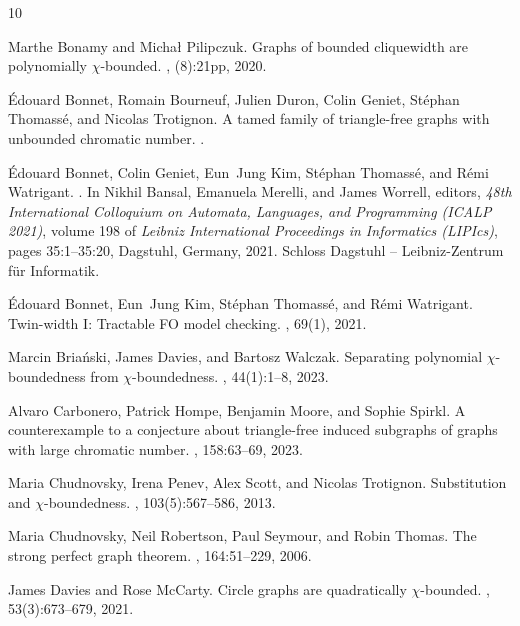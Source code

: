 \begin{thebibliography}{10}

Marthe Bonamy and Micha\l{} Pilipczuk.
\newblock Graphs of bounded cliquewidth are polynomially $\chi$-bounded.
, (8):21pp, 2020.

\'Edouard Bonnet, Romain Bourneuf, Julien Duron, Colin Geniet, Stéphan
  Thomassé, and Nicolas Trotignon.
\newblock A tamed family of triangle-free graphs with unbounded chromatic
  number.
.

\'{E}douard Bonnet, Colin Geniet, Eun~Jung Kim, St\'{e}phan Thomass\'{e}, and
  R\'{e}mi Watrigant.
.
\newblock In Nikhil Bansal, Emanuela Merelli, and James Worrell, editors, {\em
  48th International Colloquium on Automata, Languages, and Programming (ICALP
  2021)}, volume 198 of {\em Leibniz International Proceedings in Informatics
  (LIPIcs)}, pages 35:1--35:20, Dagstuhl, Germany, 2021. Schloss Dagstuhl --
  Leibniz-Zentrum f{\"u}r Informatik.

\'{E}douard Bonnet, Eun~Jung Kim, St\'{e}phan Thomass\'{e}, and R\'{e}mi
  Watrigant.
\newblock Twin-width {I}: Tractable {FO} model checking.
, 69(1), 2021.

Marcin Briański, James Davies, and Bartosz Walczak.
\newblock Separating polynomial $\chi$-boundedness from $\chi$-boundedness.
, 44(1):1--8, 2023.

Alvaro Carbonero, Patrick Hompe, Benjamin Moore, and Sophie Spirkl.
\newblock A counterexample to a conjecture about triangle-free induced
  subgraphs of graphs with large chromatic number.
, 158:63--69, 
  2023.

Maria Chudnovsky, Irena Penev, Alex Scott, and Nicolas Trotignon.
\newblock Substitution and $\chi$-boundedness.
, 103(5):567--586,
  2013.

Maria Chudnovsky, Neil Robertson, Paul Seymour, and Robin Thomas.
\newblock The strong perfect graph theorem.
, 164:51--229, 2006.

James Davies and Rose McCarty.
\newblock Circle graphs are quadratically $\chi$-bounded.
, 53(3):673--679,
  2021.


\end{thebibliography}
